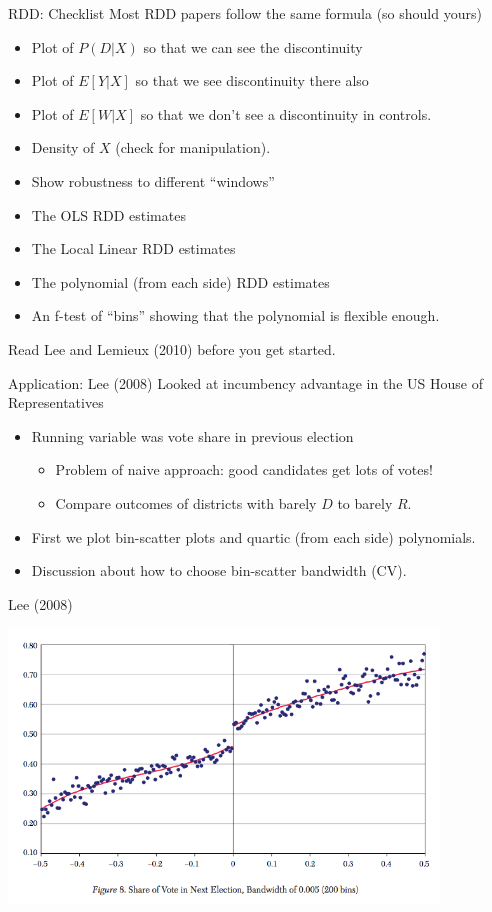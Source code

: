 	
\begin{frame}{RDD: Checklist}
Most RDD papers follow the same formula (so should yours)
\begin{itemize}
\item Plot of $P(D | X)$ so that we can see the discontinuity
\item Plot of $E[Y | X]$ so that we see discontinuity there also
\item Plot of $E[W | X ]$ so that we don't see a discontinuity in controls.
\item Density of $X$ (check for manipulation).
\item Show robustness to different ``windows''
\item The OLS RDD estimates
\item The Local Linear RDD estimates
\item The polynomial (from each side) RDD estimates
\item An f-test of ``bins'' showing that the polynomial is flexible enough.
\end{itemize}
Read Lee and Lemieux (2010) before you get started.
\end{frame}


\begin{frame}{Application: Lee (2008)}
Looked at incumbency advantage in the US House of Representatives
\begin{itemize}
\item Running variable was vote share in previous election
\begin{itemize}
\item Problem of naive approach: good candidates get lots of votes!
\item Compare outcomes of districts with barely $D$ to barely $R$.
\end{itemize}
\item First we plot bin-scatter plots and quartic (from each side) polynomials.
\item Discussion about how to choose bin-scatter bandwidth (CV).
\end{itemize}
\end{frame}

\begin{frame}{Lee (2008)}
\begin{center}
\includegraphics[width=4.5in]{./resources/binscatter1}
\end{center}
\end{frame}

